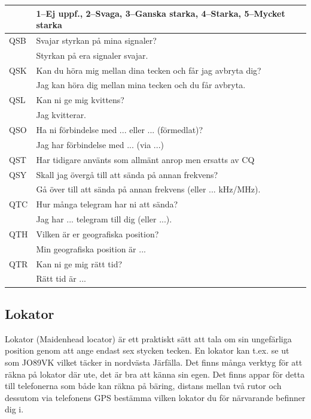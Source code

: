\begin{longtable}{ll}
	    & 1--Ej uppf., 2--Svaga, 3--Ganska starka, 4--Starka, 5--Mycket starka \\ \hline
	QSB & Svajar styrkan på mina signaler?                                     \\
	    & Styrkan på era signaler svajar.                                      \\ \hline
	QSK & Kan du höra mig mellan dina tecken och får jag avbryta dig?          \\
	    & Jag kan höra dig mellan mina tecken och du får avbryta.              \\ \hline
	QSL & Kan ni ge mig kvittens?                                              \\
	    & Jag kvitterar.                                                       \\ \hline
	QSO & Ha ni förbindelse med ... eller ... (förmedlat)?                     \\
	    & Jag har förbindelse med ... (via ...)                                \\ \hline
	QST & Har tidigare använts som allmänt anrop men ersatts av CQ             \\ \hline
	QSY & Skall jag övergå till att sända på annan frekvens?                   \\
	    & Gå över till att sända på annan frekvens (eller ... kHz/MHz).        \\ \hline
	QTC & Hur många telegram har ni att sända?                                 \\
	    & Jag har ... telegram till dig (eller ...).                           \\ \hline
	QTH & Vilken är er geografiska position?                                   \\
	    & Min geografiska position är ...                                      \\ \hline
	QTR & Kan ni ge mig rätt tid?                                              \\
	    & Rätt tid är ...                                                      \\ 
\end{longtable}

\subsection{Lokator}

Lokator (Maidenhead locator) är ett praktiskt sätt att tala om sin ungefärliga position genom att ange endast sex stycken tecken. En lokator kan t.ex. se ut som JO89VK vilket täcker in nordvästa Järfälla. Det finns många verktyg för att räkna på lokator där ute, det är bra att känna sin egen. Det finns appar för detta till telefonerna som både kan räkna på bäring, distans mellan två rutor och dessutom via telefonens GPS bestämma vilken lokator du för närvarande befinner dig i.

